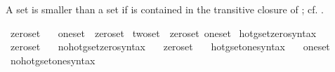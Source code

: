\begin{isabellebody}
\begin{isamarkuptext}
A set  is smaller than a set  if  is contained in the transitive
closure of ; cf. .%
\end{isamarkuptext}\isamarkuptrue%
\isamarkupfalse%
\ {\isachardoublequoteopen}zero{\isacharunderscore}{\kern0pt}set\ {\isasymequiv}\ {\isacharbraceleft}{\kern0pt}{\isacharbraceright}{\kern0pt}{\isachardoublequoteclose}\isanewline
{}\isamarkupfalse%
\ {\isachardoublequoteopen}one{\isacharunderscore}{\kern0pt}set\ {\isasymequiv}\ {\isacharbraceleft}{\kern0pt}zero{\isacharunderscore}{\kern0pt}set{\isacharbraceright}{\kern0pt}{\isachardoublequoteclose}\isanewline
{}\isamarkupfalse%
\ {\isachardoublequoteopen}two{\isacharunderscore}{\kern0pt}set\ {\isasymequiv}\ {\isacharbraceleft}{\kern0pt}zero{\isacharunderscore}{\kern0pt}set{\isacharcomma}{\kern0pt}\ one{\isacharunderscore}{\kern0pt}set{\isacharbraceright}{\kern0pt}{\isachardoublequoteclose}\isanewline
\isanewline
{}\isamarkupfalse%
\ hotg{\isacharunderscore}{\kern0pt}set{\isacharunderscore}{\kern0pt}zero{\isacharunderscore}{\kern0pt}syntax\ \ \isamarkupfalse%
\ zero{\isacharunderscore}{\kern0pt}set\ {\isacharparenleft}{\kern0pt}{\isachardoublequoteopen}{}{\isachardoublequoteclose}{\isacharparenright}{\kern0pt}\ \isamarkupfalse%
\isanewline
{}\isamarkupfalse%
\ no{\isacharunderscore}{\kern0pt}hotg{\isacharunderscore}{\kern0pt}set{\isacharunderscore}{\kern0pt}zero{\isacharunderscore}{\kern0pt}syntax\ \ \isamarkupfalse%
\ zero{\isacharunderscore}{\kern0pt}set\ {\isacharparenleft}{\kern0pt}{\isachardoublequoteopen}{}{\isachardoublequoteclose}{\isacharparenright}{\kern0pt}\ \isamarkupfalse%
\isanewline
\isanewline
{}\isamarkupfalse%
\ hotg{\isacharunderscore}{\kern0pt}set{\isacharunderscore}{\kern0pt}one{\isacharunderscore}{\kern0pt}syntax\ \ \isamarkupfalse%
\ one{\isacharunderscore}{\kern0pt}set\ {\isacharparenleft}{\kern0pt}{\isachardoublequoteopen}{}{\isachardoublequoteclose}{\isacharparenright}{\kern0pt}\ \isamarkupfalse%
\isanewline
{}\isamarkupfalse%
\ no{\isacharunderscore}{\kern0pt}hotg{\isacharunderscore}{\kern0pt}set{\isacharunderscore}{\kern0pt}one{\isacharunderscore}{\kern0pt}syntax\ \ \isamarkupfalse%

\end{isabellebody}
